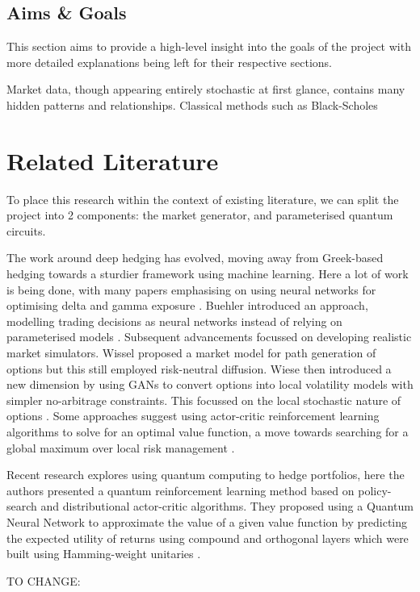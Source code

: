 \documentclass[12pt]{article}
\newcommand{\newp}
    {
    \vskip 0.5cm 
  }
\numberwithin{equation}{section}
\begin{document}
\subsection{Aims \& Goals}
This section aims to provide a high-level insight into the goals of the 
project with more detailed explanations being left for their respective sections. 
\newp 
Market data, though appearing entirely stochastic at first glance, contains many 
hidden patterns and relationships. Classical methods such as Black-Scholes  
\autocite{blackscholes} 
\section{Related Literature}
To place this research within the context of existing literature, we can split 
the project into 2 components: the market generator, and 
parameterised quantum circuits.
\newp
The work around deep hedging has evolved, moving away from 
Greek-based hedging towards a sturdier framework using machine 
learning. Here a lot of work is being done, with many papers emphasising 
on using neural networks for optimising delta and gamma exposure
\autocite{armstrong_deep_2024,qiao_enhancing_2024}.
Buehler introduced an approach, modelling trading decisions 
as neural networks instead of relying on parameterised models
\autocite{buehler_deep_2019}. Subsequent advancements focussed on developing 
realistic market simulators. Wissel 
proposed a market model for path generation of options but this still 
employed risk-neutral diffusion\autocite{schweizer_arbitrage-free_2008}. Wiese 
then introduced 
a new dimension by using GANs to convert options into 
local volatility models with simpler no-arbitrage constraints. This focussed 
on the local stochastic nature of options
\autocite{choudhary_funvol_2023,wiese_deep_2019,wiese_multi-asset_2021}.
Some approaches suggest using actor-critic reinforcement learning algorithms to 
solve for an optimal value function, a move towards searching for a global
maximum over local risk management
\autocite{buehler_deep_2022,movahed_introducing_2024}.
\newp
Recent research explores using quantum computing to 
hedge portfolios, here the authors presented a quantum reinforcement learning 
method based on policy-search and distributional actor-critic algorithms. 
They proposed using a Quantum Neural Network to approximate the value of a 
given value function by predicting the expected utility of returns using compound 
and orthogonal layers which were built using Hamming-weight
unitaries \autocite{kerenidis_classical_2022}. 
\newp TO CHANGE:
\end{document}
